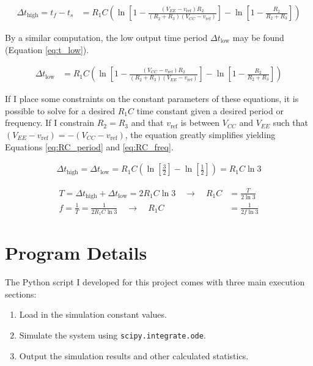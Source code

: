 \documentclass[12pt]{article}
\begin{document}
\begin{align} \label{eq:t_high}
\Delta t_\text{high} = t_f - t_s &= R_1C \left(\ln \left[1 - \frac{\left(V_{EE} - v_\text{ref}\right)R_2}{\left(R_2 + R_3\right)\left( V_{CC} - v_\text{ref} \right)}\right] - \ln \left[1 - \frac{R_2}{R_2 + R_3}\right] \right)
\end{align}

\noindent
By a similar computation, the low output time period $\Delta t_\text{low}$ may be found (Equation \ref{eq:t_low}).

\begin{align} \label{eq:t_low}
\Delta t_\text{low} &= R_1C \left(\ln \left[1 - \frac{\left(V_{CC} - v_\text{ref}\right)R_2}{\left(R_2 + R_3\right)\left( V_{EE} - v_\text{ref} \right)}\right] - \ln \left[1 - \frac{R_2}{R_2 + R_3}\right] \right)
\end{align}

If I place some constraints on the constant parameters of these equations, it is possible to solve for a desired $R_1C$ time constant given a desired period or frequency. If I constrain $R_2 = R_3$ and that $v_\text{ref}$ is between $V_{CC}$ and $V_{EE}$ such that $\left(V_{EE} - v_\text{ref}\right) = - \left(V_{CC} - v_\text{ref}\right)$, the equation greatly simplifies yielding Equations \ref{eq:RC_period} and \ref{eq:RC_freq}.

\begin{align}
\Delta t_\text{high} = \Delta t_\text{low} = R_1C \left(\ln \left[\frac{3}{2}\right] - \ln \left[\frac{1}{2}\right] \right) = R_1C\ln 3 \nonumber
\end{align}

\begin{align}
\label{eq:RC_period}
T = \Delta t_\text{high} + \Delta t_\text{low} = 2 R_1C\ln 3 \quad \rightarrow \quad R_1C &= \frac{T}{2\ln 3}\\
\label{eq:RC_freq}
f = \frac{1}{T} = \frac{1}{2 R_1C\ln 3} \quad \rightarrow \quad  R_1C &= \frac{1}{2f\ln 3}
\end{align}

\section{Program Details}
The Python script I developed for this project comes with three main execution sections:
\begin{enumerate}[label*=(\roman*)]
    \item \label{it:load} Load in the simulation constant values.
    \item \label{it:sim} Simulate the system using \texttt{scipy.integrate.ode}.
    \item \label{it:out} Output the simulation results and other calculated statistics.
\end{enumerate}
\end{document}
